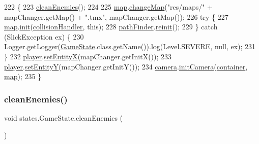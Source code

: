 \begin{DoxyCode}
222                                                  \{
223         \mbox{\hyperlink{classstates_1_1_game_state_a0d50f38e70aa11191ecdc79a7df4c91b}{cleanEnemies}}();
224 
225         \mbox{\hyperlink{classstates_1_1_game_state_ab5dc1b5f4f87c6fc5684832bfba3b939}{map}}.\mbox{\hyperlink{classentities_1_1_map_aa6e658d7d233c2f7d52d10e65d8f3d8e}{changeMap}}(\textcolor{stringliteral}{"res/maps/"} + mapChanger.getMap() + \textcolor{stringliteral}{".tmx"}, mapChanger.getMap());
226         \textcolor{keywordflow}{try} \{
227             \mbox{\hyperlink{classstates_1_1_game_state_ab5dc1b5f4f87c6fc5684832bfba3b939}{map}}.\mbox{\hyperlink{classentities_1_1_map_a183d1b160c442fc50c37cf0cb956f5cd}{init}}(\mbox{\hyperlink{classstates_1_1_game_state_a7640e08453b2ce79066278d32d28ab63}{collisionHandler}}, \textcolor{keyword}{this});
228             \mbox{\hyperlink{classstates_1_1_game_state_aeaae3c340636293db4737187e847f764}{pathFinder}}.\mbox{\hyperlink{classentities_1_1_path_finder_a43344b26144ea29f390b8be84f14ee7a}{reinit}}();
229         \} \textcolor{keywordflow}{catch} (SlickException ex) \{
230             Logger.getLogger(\mbox{\hyperlink{classstates_1_1_game_state_ad9c29c35e2006697858b75c75a6c9b8b}{GameState}}.class.getName()).log(Level.SEVERE, null, ex);
231         \}
232         \mbox{\hyperlink{classstates_1_1_game_state_ae8ec891c55e1c5d43372a289d8a6d87e}{player}}.\mbox{\hyperlink{classentities_1_1_mobile_entity_a99e4a1603aabaaf21c91ffad2e0d86cf}{setEntityX}}(mapChanger.getInitX());
233         \mbox{\hyperlink{classstates_1_1_game_state_ae8ec891c55e1c5d43372a289d8a6d87e}{player}}.\mbox{\hyperlink{classentities_1_1_mobile_entity_a08206aa00cd7b2e7d5cfeb2b1b2338cb}{setEntityY}}(mapChanger.getInitY());
234         \mbox{\hyperlink{classstates_1_1_game_state_a0ed0ff756171316575f1bb875591b14d}{camera}}.\mbox{\hyperlink{classentities_1_1_camera_aae34158cc2c20916570929c01605dc5c}{initCamera}}(\mbox{\hyperlink{classstates_1_1_game_state_a88b0df4b57ada742c53e4e1ee3b25827}{container}}, \mbox{\hyperlink{classstates_1_1_game_state_ab5dc1b5f4f87c6fc5684832bfba3b939}{map}});
235     \}
\end{DoxyCode}
\mbox{\label{classstates_1_1_game_state_a0d50f38e70aa11191ecdc79a7df4c91b}} 
\subsubsection{\texorpdfstring{clean\+Enemies()}{cleanEnemies()}}
{\footnotesize\ttfamily void states.\+Game\+State.\+clean\+Enemies (\begin{DoxyParamCaption}{ }\end{DoxyParamCaption})\hspace{0.3cm}{\ttfamily [inline]}}


